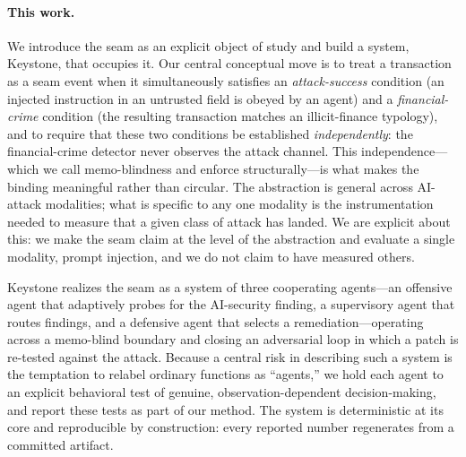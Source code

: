 \documentclass[10pt,twocolumn]{article}
\begin{document}
\paragraph{This work.}
We introduce the seam as an explicit object of study and build a system,
Keystone, that occupies it. Our central conceptual move is to treat a
transaction as a seam event when it simultaneously satisfies an
\emph{attack-success} condition (an injected instruction in an untrusted field is
obeyed by an agent) and a \emph{financial-crime} condition (the resulting
transaction matches an illicit-finance typology), and to require that these two
conditions be established \emph{independently}: the financial-crime detector
never observes the attack channel. This independence---which we call
memo-blindness and enforce structurally---is what makes the binding meaningful
rather than circular. The abstraction is general across AI-attack modalities;
what is specific to any one modality is the instrumentation needed to measure
that a given class of attack has landed. We are explicit about this: we make the
seam claim at the level of the abstraction and evaluate a single modality,
prompt injection, and we do not claim to have measured others.

Keystone realizes the seam as a system of three cooperating agents---an
offensive agent that adaptively probes for the AI-security finding, a
supervisory agent that routes findings, and a defensive agent that selects a
remediation---operating across a memo-blind boundary and closing an
adversarial loop in which a patch is re-tested against the attack. Because a
central risk in describing such a system is the temptation to relabel ordinary
functions as ``agents,'' we hold each agent to an explicit behavioral test of
genuine, observation-dependent decision-making, and report these tests as part
of our method. The system is deterministic at its core and reproducible by
construction: every reported number regenerates from a committed artifact.
\end{document}
